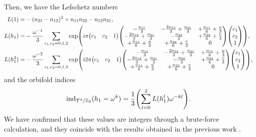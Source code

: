 \documentclass[11pt]{article}
\newcommand{\Lef}{Lefschetz }
\begin{document}
Then, we have the \Lef numbers
\begin{align}
L(1)=&- (n_{21}- n_{12})^2 + n_{11} n_{22}- n_{12}n_{21}, \\
    L(h_1)=&-\frac{\omega^{-1}}{3} \sum_{c_1, c_2=0,1,2} \exp(i\pi \mqty( c_1& c_2& 1) \mqty( -\frac{n_{11}}{3} & - \frac{2 n_{12}}{3} + \frac{ n_{21}}{3} & + \frac{n_{11}}{6} +\frac{u}{3} \\
    - \frac{2 n_{12}}{3} + \frac{ n_{21}}{3} & -\frac{n_{22}}{3} &  + \frac{n_{22}}{6} + \frac{v}{3} \\
     + \frac{n_{11}}{6} + \frac{u}{3} &  +\frac{n_{22}}{6} + \frac{v}{3} & 0 ) \mqty(c_1 \\ c_2 \\1 )), \\
     L(h_1^2)=&-\frac{\omega^{-2}}{3} \sum_{c_1, c_2=0,1,2} \exp(i2\pi \mqty( c_1& c_2& 1) \mqty( -\frac{n_{11}}{3} & - \frac{2 n_{12}}{3} + \frac{ n_{21}}{3} & + \frac{n_{11}}{6} +\frac{u}{3} \\
    - \frac{2 n_{12}}{3} + \frac{ n_{21}}{3} & -\frac{n_{22}}{3} &  + \frac{n_{22}}{6} + \frac{v}{3} \\
     + \frac{n_{11}}{6} + \frac{u}{3} &  +\frac{n_{22}}{6} + \frac{v}{3} & 0 ) \mqty(c_1 \\ c_2 \\1 )),
\end{align}
and the orbifold indices 
\begin{align}
    \text{ind}_{T^4/\mathbb{Z}_3}(h_1= \omega^k)= \frac{1}{3}\qty(\sum_{l=0}^2 L(h_1^l) \omega^{-kl}).
\end{align}
We have confirmed that these values are integers through a brute-force calculation, and they coincide
with the results obtained in the previous work \cite{Kikuchi:2022psj}. 

\end{document}
